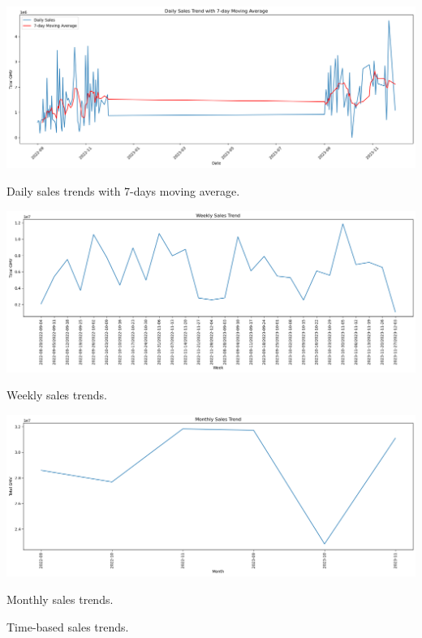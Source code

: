 \documentclass{article}
\begin{document}
        \begin{center}
        
        \includegraphics[width=\textwidth]{images/daily.png}
        \caption{Daily sales trends with 7-days moving average.}
    \end{center}
    \begin{center}
        
        \includegraphics[width=\textwidth]{images/weekly.png}
        \caption{Weekly sales trends.}
    \end{center}
    \begin{center}
        
        \includegraphics[width=\textwidth]{images/monthly.png}
        \caption{Monthly sales trends.}
    \end{center}
    \caption{Time-based sales trends.}
\end{document}
